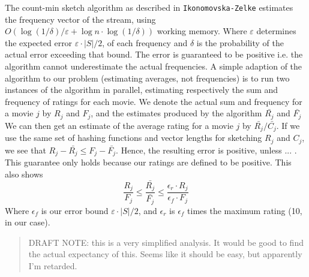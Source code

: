The count-min sketch algorithm as described in \texttt{Ikonomovska\--Zelke}
estimates the frequency vector of the stream, using
$O(\log(1/\delta)/\varepsilon + \log n \cdot \log(1/\delta))$ working memory.
Where $\varepsilon$ determines the expected error $\varepsilon \cdot |S| /2$, of
each frequency and $\delta$ is the probability of the actual error exceeding
that bound. The error is guaranteed to be positive i.e. the algorithm cannot
underestimate the actual frequencies. A simple adaption of the algorithm to our
problem (estimating averages, not frequencies) is to run two instances of the
algorithm in parallel, estimating respectively the sum and frequency of ratings
for each movie. We denote the actual sum and frequency for a movie $j$ by $R_j$
and $F_j$, and the estimates produced by the algorithm $\bar{R_j}$ and
$\bar{F_j}$ We can then get an estimate of the average rating for a movie $j$ by
$\bar{R_j}/\bar{C_j}$.
If we use the same set of hashing functions and
vector lengths for sketching $R_j$ and $C_j$, we see that
$R_j-\bar{R_j} \le F_j-\bar{F_j}$. Hence, the resulting error is
positive, unless ... . This guarantee only holds because our ratings are
defined to be positive. This also shows
$$\frac{R_j}{F_j} \le \frac{\bar{R_j}}{\bar{F_j}} \le \frac{\epsilon_r \cdot
R_j}{\epsilon_f \cdot F_j}$$
Where $\epsilon_f$ is our error bound $\varepsilon \cdot |S|/2$, and
$\epsilon_r$ is $\epsilon_f$ times the maximum rating (10, in our case).

\begin{quote}
	DRAFT NOTE: this is a very simplified analysis.
	It would be good to find the actual expectancy of this. Seems like it
	should be easy, but apparently I'm retarded.
\end{quote}
